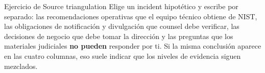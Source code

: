 \begin{importantbox}{Ejercicio de Source triangulation}
Elige un incident hipotético y escribe por separado: las recomendaciones operativas que el equipo técnico obtiene de NIST, las obligaciones de notificación y divulgación que counsel debe verificar, las decisiones de negocio que debe tomar la dirección y las preguntas que los materiales judiciales \textbf{no pueden} responder por ti. Si la misma conclusión aparece en las cuatro columnas, eso suele indicar que los niveles de evidencia siguen mezclados.
\end{importantbox}


